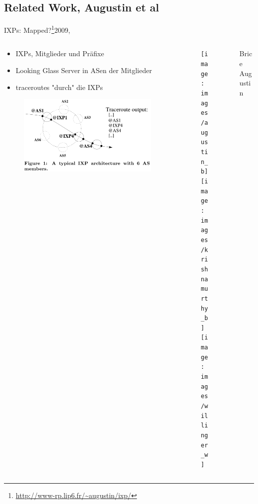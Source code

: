 \documentclass[ngerman,compress,hyperref={bookmarks}]{beamer}
\begin{document}
\subsection{Related Work, Augustin et al}
\begin{frame}{IXPs: Mapped?\footnote{\url{http://www-rp.lip6.fr/~augustin/ixp/}}}{2009, \cite{Augustin:2009:IM:1644893.1644934}}
  \begin{columns}[c]
    \begin{column}{0.55\textwidth}
      \begin{itemize}
        \item IXPs, Mitglieder und Präfixe
        \item Looking Glass Server in ASen der Mitglieder
        \item traceroutes "durch" die IXPs
      \end{itemize}
      \begin{figure}
        \label{augustin_ixp}
        \includegraphics[width=1\textwidth]{images/augustin_ixp}
      \end{figure}
    \end{column}
    \begin{column}{0.1\textwidth}
      \begin{figure}
        \label{augustin}
        \texttt{[image: images/augustin\_b]}\\
        \texttt{[image: images/krishnamurthy\_b]}\\
        \texttt{[image: images/willinger\_w]}
      \end{figure}
    \end{column}
    \begin{column}{0.3\textwidth}
      {\scriptsize Brice Augustin\\
      \vspace{0.1cm}
}
\end{column}
\end{columns}
\end{frame}
\end{document}

